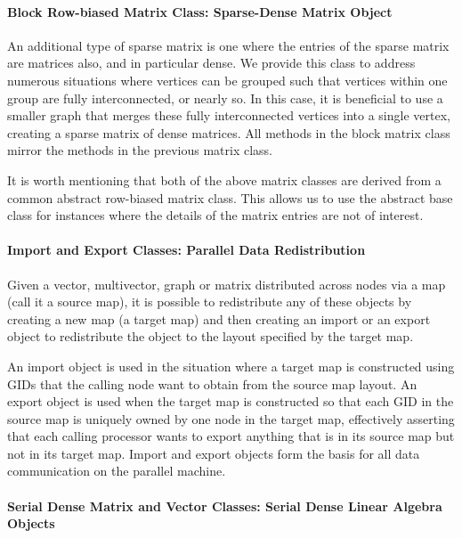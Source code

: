 \documentclass[12pt,relax]{PetraObjectModel}
\begin{document}
\paragraph{Block Row-biased Matrix Class:  Sparse-Dense Matrix Object}

An additional type of sparse matrix is one where the entries of the sparse matrix are 
matrices also, and in particular dense.  We provide this class to address numerous 
situations where vertices can be grouped such that vertices within one group are fully 
interconnected, or nearly so.  In this case, it is beneficial to use a smaller graph 
that merges these fully interconnected vertices into a single vertex, creating a sparse 
matrix of dense matrices.  All methods in the block matrix class mirror the methods 
in the previous matrix class.  

It is worth mentioning that both of the above matrix classes are derived from a common 
abstract row-biased matrix class.  This allows us to use the abstract base class for 
instances where the details of the matrix entries are not of interest.

\paragraph{Import and Export Classes:  Parallel Data Redistribution}

Given a vector, multivector, graph or matrix distributed across nodes via a map (call 
it a source map), it is possible to redistribute any of these objects by creating a 
new map (a target map) and then creating an import or an export object to redistribute 
the object to the layout specified by the target map.

An import object is used in the situation where a target map is constructed using GIDs 
that the calling node want to obtain from the source map layout.  An export object is 
used when the target map is constructed so that each GID in the source map is uniquely 
owned by one node in the target map, effectively asserting that each calling processor 
wants to export anything that is in its source map but not in its target map.  Import 
and export objects form the basis for all data communication on the parallel machine.

\paragraph{Serial Dense Matrix and Vector Classes:  Serial Dense Linear Algebra Objects}
\end{document}

